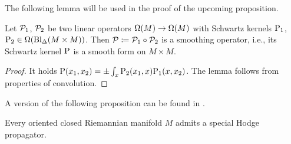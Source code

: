 \documentclass[\MainFolder/Text.tex]{subfiles}
\begin{document}
The following lemma will be used in the proof of the upcoming proposition.
\begin{Lemma}\label{Lem:Smoothing}
Let $\mathcal{P}_1$, $\mathcal{P}_2$ be two linear operators $\Omega(M) \rightarrow \Omega(M)$ with Schwartz kernels $\mathrm{P}_1$, $\mathrm{P}_2 \in \Omega(\mathrm{Bl}_\Delta(M\times M))$. Then $\mathcal{P}\coloneqq \mathcal{P}_1 \circ \mathcal{P}_2$ is a smoothing operator, i.e., its Schwartz kernel $\mathrm{P}$ is a smooth form on $M\times M$. 
\end{Lemma}
\begin{proof}
It holds $\mathrm{P}(x_1,x_2) = \pm \int_x \mathrm{P}_2(x_1,x) \mathrm{P}_1(x,x_2)$. The lemma follows from properties of convolution.
\end{proof}

A version of the following proposition can be found in \cite{Mnev2009}.
\begin{Proposition} \label{Prop:ExistenceG}
Every oriented closed Riemannian manifold $M$ admits a special Hodge propagator.
\end{Proposition}
\end{document}
